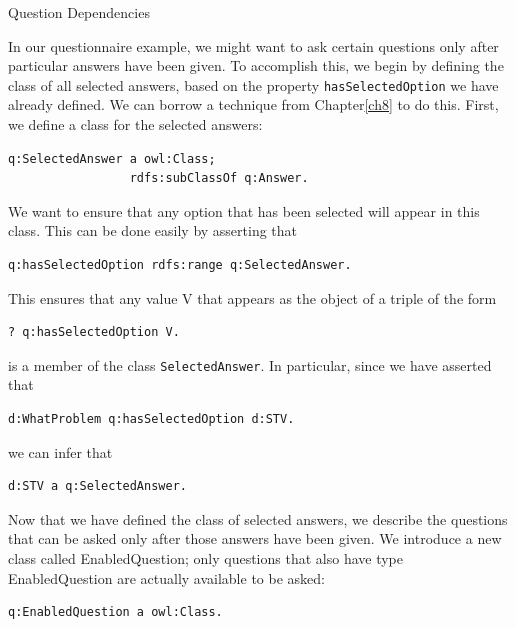 \begin{example}{Question Dependencies}

In our questionnaire example, we might want to ask certain questions
only after particular answers have been given. To accomplish this, we
begin by defining the class of all selected answers, based on the
property \texttt{hasSelectedOption} we have already defined. We can borrow a
technique from Chapter\ref{ch8} to do this. First, we define a class for the
selected answers:

\begin{lstlisting}
q:SelectedAnswer a owl:Class;
                 rdfs:subClassOf q:Answer.
\end{lstlisting}

We want to ensure that any option that has been selected will appear in
this class. This can be done easily by asserting that

\begin{lstlisting}
q:hasSelectedOption rdfs:range q:SelectedAnswer.
\end{lstlisting}

This ensures that any value V that appears as the object of a triple of
the form

\begin{lstlisting}
? q:hasSelectedOption V.
\end{lstlisting}

is a member of the class \texttt{SelectedAnswer}. In particular, since we have
asserted that

\begin{lstlisting}
d:WhatProblem q:hasSelectedOption d:STV.
\end{lstlisting}

we can infer that

\begin{lstlisting}
d:STV a q:SelectedAnswer.
\end{lstlisting}

\end{example}

Now that we have defined the class of selected answers, we describe the
questions that can be asked only after those answers have been given. We
introduce a new class called EnabledQuestion; only questions that also
have type EnabledQuestion are actually available to be asked:

\begin{lstlisting}
q:EnabledQuestion a owl:Class.
\end{lstlisting}

